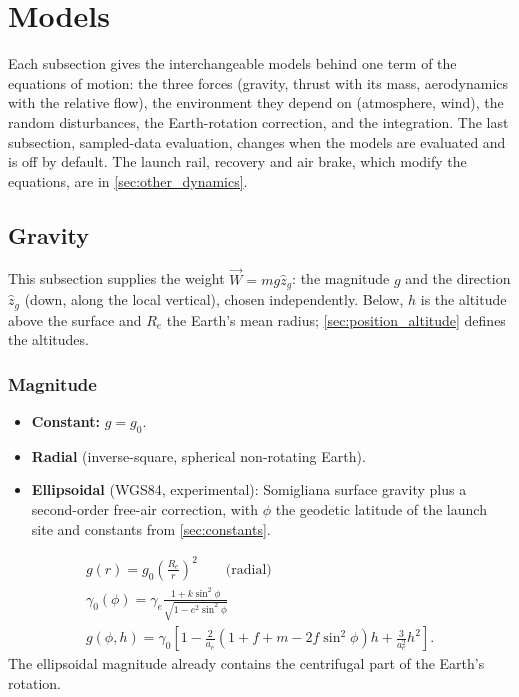 \section{Models}\label{sec:models}
Each subsection gives the interchangeable models behind one term of the equations of motion: the
three forces (gravity, thrust with its mass, aerodynamics with the relative flow), the environment
they depend on (atmosphere, wind), the random disturbances, the Earth-rotation correction, and the
integration. The last subsection, sampled-data evaluation, changes when the models are evaluated
and is off by default. The launch rail, recovery and air brake, which modify the equations, are in
\autoref{sec:other_dynamics}.

\subsection{Gravity}\label{sec:gravity}
This subsection supplies the weight $\vec{W}=mg\hat{z}_g$: the magnitude $g$ and the direction
$\hat{z}_g$ (down, along the local vertical), chosen independently. Below, $h$ is the altitude above
the surface and $R_e$ the Earth's mean radius; \autoref{sec:position_altitude} defines the altitudes.

\subsubsection{Magnitude}
\begin{itemize}
    \item \textbf{Constant:} $g=g_0$.
    \item \textbf{Radial} (inverse-square, spherical non-rotating Earth).
    \item \textbf{Ellipsoidal} (WGS84, experimental): Somigliana surface gravity plus a
    second-order free-air correction, with $\phi$ the geodetic latitude of the launch site and
    constants from \autoref{sec:constants}.
\end{itemize}
\begin{gather}
    g(r)=g_0\left(\frac{R_e}{r}\right)^2 \qquad \text{(radial)} \\
    \gamma_0(\phi) = \gamma_e\frac{1+k\sin^2\phi}{\sqrt{1-e^2\sin^2\phi}} \\
    g(\phi, h) = \gamma_0\left[1 - \frac{2}{a_e}\left(1+f+m-2f\sin^2\phi\right)h + \frac{3}{a_e^2}h^2\right].
\end{gather}
The ellipsoidal magnitude already contains the centrifugal part of the Earth's rotation.

